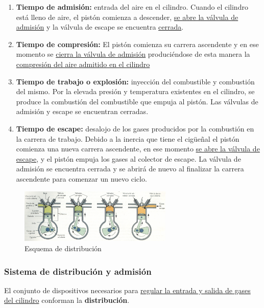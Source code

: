 \documentclass[a4paper,12pt,oneside]{article}
\begin{document}
\begin{enumerate}
\item \textbf{Tiempo de admisión:} entrada del aire en el cilindro. Cuando el cilindro
está lleno de aire, el pistón comienza a descender, \uline{se abre la válvula de
admisión} y la válvula de escape se encuentra \uline{cerrada}.
\item \textbf{Tiempo de compresión:} El pistón comienza su carrera ascendente y en ese
momento se \uline{cierra la válvula de admisión} produciéndose de esta manera la
\uline{compresión del aire admitido en el cilindro}
\item \textbf{Tiempo de trabajo o explosión:} inyección del combustible y combustión del
mismo. Por la elevada presión y temperatura existentes en el cilindro, se
produce la combustión del combustible que empuja al pistón. Las válvulas de
admisión y escape se encuentran cerradas.
\item \textbf{Tiempo de escape:} desalojo de los gases producidos por la combustión en la
carrera de trabajo. Debido a la inercia que tiene el cigüeñal el pistón
comienza una nueva carrera ascendente, en ese momento \uline{se abre la válvula de
escape}, y el pistón empuja los gases al colector de escape. La válvula de
admisión se encuentra cerrada y se abrirá de nuevo al finalizar la carrera
ascendente para comenzar un nuevo ciclo.
\end{enumerate}

\begin{center}
\begin{figure}[htbp]
\centering
\includegraphics[width=0.65\textwidth]{./img_0009/esquema_cuatrot.png}
\caption{Esquema de distribución}
\end{figure}
\end{center}

\subsubsection{Sistema de distribución y admisión}
\label{sec:orge931ba5}
El conjunto de dispositivos necesarios para \uline{regular la entrada y salida de 
gases del cilindro} conforman la \textbf{distribución}.
\end{document}
